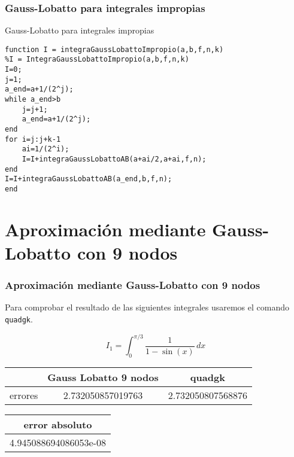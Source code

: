 \documentclass{beamer}
\begin{document}

\begin{frame}[fragile] %
\frametitle{Gauss-Lobatto para integrales impropias}
\begin{exampleblock}{Gauss-Lobatto para integrales impropias}
\begin{verbatim}
function I = integraGaussLobattoImpropio(a,b,f,n,k)
%I = IntegraGaussLobattoImpropio(a,b,f,n,k)
I=0;
j=1;
a_end=a+1/(2^j);
while a_end>b
    j=j+1;
    a_end=a+1/(2^j);
end
for i=j:j+k-1
    ai=1/(2^i);
    I=I+integraGaussLobattoAB(a+ai/2,a+ai,f,n);
end
I=I+integraGaussLobattoAB(a_end,b,f,n);
end\end{verbatim}
\end{exampleblock}
\end{frame}

\section{Aproximación mediante Gauss-Lobatto con 9 nodos}

\begin{frame}
\frametitle{Aproximación mediante Gauss-Lobatto con 9 nodos}

Para comprobar el resultado de las siguientes integrales usaremos el comando \texttt{quadgk}.

\[
\displaystyle I_1 = \int_{0}^{\pi/3} \! \frac{1}{1 - \sin(x)} \, dx
\]

\begin{table}[h]
    \centering
    \begin{tabular}{|c|c|c|}
        \hline
        \rowcolor{gray!30}
         & Gauss Lobatto 9 nodos & quadgk \\
        \hline
         errores & 2.732050857019763 & 2.732050807568876 \\
        \hline
    \end{tabular}
\end{table}

\vspace{0.5em}

\begin{table}[h]
    \centering
    \begin{tabular}{|c|}
        \hline
        \rowcolor{gray!30}
         error absoluto \\
        \hline
         4.945088694086053e-08 \\
        \hline
    \end{tabular}
\end{table}
\end{frame}
\end{document}
